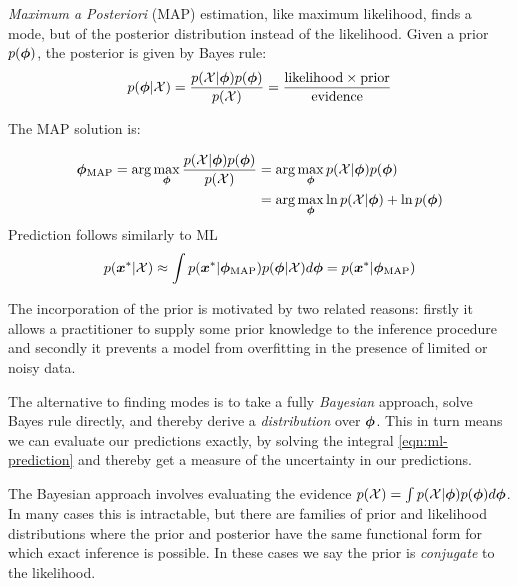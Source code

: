 
\emph{Maximum a Posteriori} (MAP) estimation, like maximum likelihood, finds a mode, but of the posterior distribution instead of the likelihood. Given a prior $p({ \bm \phi })$, the posterior is given by Bayes rule:
\begin{align}
p({ \bm \phi } | { \mathcal{X} }) = \frac{p({ \mathcal{X} } | { \bm \phi })p({ \bm \phi })}{p({ \mathcal{X} })} = \frac{\text{likelihood} \times \text{prior}}{\text{evidence}}
\end{align}

The MAP solution is:

\begin{align}
{ { {  \bm \phi  } }_{\text{MAP}} } = \arg \max_{{ \bm \phi }} \frac{p({ \mathcal{X} } | { \bm \phi })p({ \bm \phi })}{p({ \mathcal{X} })}
 & = \arg \max_{{ \bm \phi }} p({ \mathcal{X} } | { \bm \phi })p({ \bm \phi }) \\
 & = \arg \max_{ \bm \phi } \ln p({ \mathcal{X} } | { \bm \phi }) + \ln p({ \bm \phi })
\end{align}
Prediction follows similarly to ML
\begin{align}
p({ \bm x^{*} } | { \mathcal{X} }) \approx \int p({ \bm x^{*} } | { {{ \bm \phi }}_{\text{MAP}} })p({ \bm \phi }|{ \mathcal{X} })d{ \bm \phi } = p({ \bm x^{*} } | { {{ \bm \phi }}_{\text{MAP}} })
\end{align}



The incorporation of the prior is motivated by two related reasons: firstly it allows a practitioner to supply some prior knowledge to the inference procedure and secondly it prevents a model from overfitting in the presence of limited or noisy data.

The alternative to finding modes is to take a fully \emph{Bayesian} approach, solve Bayes rule directly, and thereby derive a \emph{distribution} over ${ \bm \phi }$. This in turn means we can evaluate our predictions exactly, by solving the integral \eqref{eqn:ml-prediction} and thereby get a measure of the uncertainty in our predictions.

The Bayesian approach involves evaluating the evidence $p({ \mathcal{X} }) = \int p({ \mathcal{X} } | { \bm \phi }) p({ \bm \phi }) d{ \bm \phi }$. In many cases this is intractable, but there are families of prior and likelihood distributions where the prior and posterior have the same functional form for which exact inference is possible. In these cases we say the prior is \emph{conjugate} to the likelihood.

